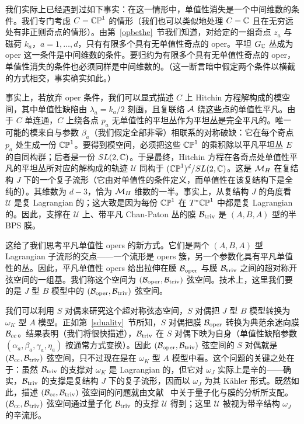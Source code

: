 
我们实际上已经遇到过如下事实：在这一情形中，单值性消失是一个中间维数的条件。我们专门考虑 $C={\mathbb{CP}}^1$ 的情形（我们也可以类似地处理 $C={\mathbb C}$ 且在无穷远处有非正则奇点的情形）。由第~\ref{opbethe}~节我们知道，对给定的一组奇点 $z_a$ 与磁荷 $k_a$，$a=1,\dots,d$，只有有限多个具有无单值性奇点的 oper。平坦 $G_{\mathbb C}$ 丛成为 oper 这一条件是中间维数的条件。要归约为有限多个具有无单值性奇点的 oper，单值性消失的条件也必须同样是中间维数的。（这一断言暗中假定两个条件以横截的方式相交，事实确实如此。）

事实上，若放弃 oper 条件，我们可以显式描述 $C$ 上 Hitchin 方程解构成的模空间，其中单值性缺陷由 $\lambda_a=k_a/2$ 刻画，且复联络 ${\mathcal A}$ 绕这些点的单值性平凡。由于 $C$ 单连通，$C$ 上绕各点 $p_a$ 无单值性的平坦丛作为平坦丛是完全平凡的。唯一可能的模来自与参数 $\beta_a$（我们假定全部非零）相联系的对称破缺：它在每个奇点 $p_a$ 处生成一份 ${\mathbb{CP}}^1$。要得到模空间，必须把这些 ${\mathbb{CP}}^1$ 的乘积除以平凡平坦丛 $E$ 的自同构群；后者是一份 $SL(2,{\mathbb C})$。于是最终，Hitchin 方程在各奇点处单值性平凡的平坦丛所对应的解构成的轨迹 $\mathcal U$ 同构于 $({\mathbb{CP}}^1)^d/SL(2,{\mathbb C})$。这是 ${\mathcal M}_H$ 在复结构 $J$ 下的一个复子流形（它由对单值性的条件定义，而单值性在该复结构下是全纯的）。其维数为 $d-3$，恰为 ${\mathcal M}_H$ 维数的一半。事实上，从复结构 $J$ 的角度看 $\mathcal U$ 是复 Lagrangian 的；这大致是因为每份 ${\mathbb{CP}}^1 $ 在 $T^*{\mathbb{CP}}^1$ 中都是复 Lagrangian 的。因此，支撑在 $\mathcal U$ 上、带平凡 Chan-Paton 丛的膜 ${\mathcal B}_{\mathrm{triv}}$ 是 $(A,B,A)$ 型的半 BPS 膜。


这给了我们思考平凡单值性 opers 的新方式。它们是两个 $(A,B,A)$ 型 Lagrangian 子流形的交点——一个流形是 opers 簇，另一个参数化具有平凡单值性的丛。因此，平凡单值性 opers 给出拉伸在膜 ${\mathcal B_{\mathrm{oper}}}$ 与膜 ${\mathcal B}_{\mathrm{triv}}$ 之间的超对称开弦空间的一组基。我们称这个空间为 $({\mathcal B_{\mathrm{oper}}},{\mathcal B}_{\mathrm{triv}})$ 弦空间。技术上，这里我们要的是 $J$ 型 $B$ 模型中的 $({\mathcal B_{\mathrm{oper}}},{\mathcal B}_{\mathrm{triv}})$ 弦空间。

我们可以利用 $S$ 对偶来研究这个超对称弦态空间，$S$ 对偶把 $J$ 型 $B$ 模型转换为 $\omega_K$ 型 $A$ 模型。正如第~\ref{sduality}~节所知，$S$ 对偶把膜 ${\mathcal B_{\mathrm{oper}}}$ 转换为典范余迷向膜 ${\mathcal B_{\mathrm{cc}}}$。结果表明（我们将很快描述），${\mathcal B}_{\mathrm{triv}}$ 在 $S$ 对偶下映为自身（单值性缺陷参数 $(\alpha_a,\beta_a,\gamma_a,\eta_a)$ 按通常方式变换）。因此 $({\mathcal B_{\mathrm{oper}}},{\mathcal B}_{\mathrm{triv}})$ 弦空间的 $S$ 对偶就是 $({\mathcal B_{\mathrm{cc}}},{\mathcal B}_{\mathrm{triv}})$ 弦空间，只不过现在是在 $\omega_K$ 型 $A$ 模型中看。这个问题的关键之处在于：虽然 ${\mathcal B}_{\mathrm{triv}}$ 的支撑对 $\omega_K$ 是 Lagrangian 的，但它对 $\omega_J$ 实际上是辛的——确实，${\mathcal B}_{\mathrm{triv}}$ 的支撑是复结构 $J$ 下的复子流形，因而以 $\omega_J$ 为其 Kähler 形式。既然如此，描述 $({\mathcal B_{\mathrm{cc}}},{\mathcal B}_{\mathrm{triv}})$ 弦空间的问题就由文献~\cite{GuWtwo} 中关于量子化与膜的分析所支配。$({\mathcal B_{\mathrm{cc}}},{\mathcal B}_{\mathrm{triv}})$ 弦空间通过量子化 ${\mathcal B}_{\mathrm{triv}}$ 的支撑 $\mathcal U$ 得到；这里 $\mathcal U$ 被视为带辛结构 $\omega_J$ 的辛流形。



